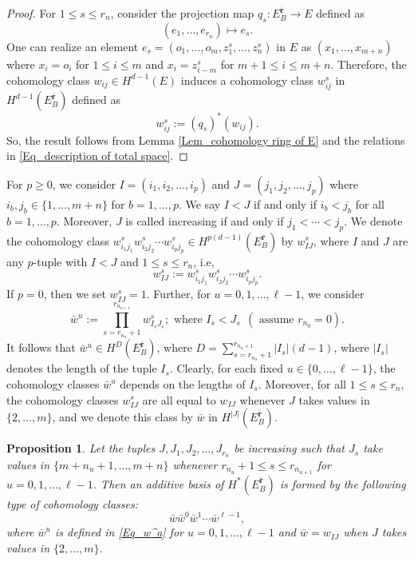 \documentclass[12pt,oneside,reqno]{amsart}
\theoremstyle{plain}
\newtheorem{proposition}[theorem]{Proposition}
\theoremstyle{definition}
\theoremstyle{remark}
\newcommand{\br}{\bar{\mathbf{r}}}
\begin{document}
\begin{proof}
For $1\leq s \leq r_n$, consider the projection map $q_s : E_B^{\br} \to E$ defined as 
$$(e_1, \ldots, e_{r_n})\mapsto e_s.$$
One can realize an element $e_s = (o_1, \ldots, o_m, z^s_1, \ldots, z^s_n)$ in $E$ as $(x_1, \ldots, x_{m+n})$ where $x_i = o_i$ for $1\leq i\leq m$ and $x_i = z^s_{i-m}$ for $m+1\leq i \leq m+n$. Therefore, the cohomology class $w_{ij}\in H^{d-1}(E)$ induces a cohomology class $w^s_{ij}$ in $H^{d-1}(E_B^{\br})$ defined as $$w^s_{ij} := (q_{s})^*(w_{ij}).$$
So, the result follows from Lemma \ref{Lem_cohomology ring of E} and the relations in \eqref{Eq_description of total space}.
\end{proof}




For $p\geq 0$, we consider $I = (i_1, i_2, \dots , i_p)$ and $J = (j_1, j_2, \dots , j_p)$ where $i_b, j_b \in \{1,\dots, m +n\}$ for $b = 1,\dots, p$. We say $I<J$ if and only if $i_b< j_b$ for all $b=1,\dots, p$. Moreover, $J$ is called increasing if and only if $j_1 < \cdots < j_p$.  
We denote the cohomology class $w^s_{i_1j_1} w^s_{i_2j_2} \cdots w^s_{i_pj_p}\in H^{p(d-1)}(E^{\br}_B)$ by $w^s_{IJ}$, where $I$ and $J$  are any $p$-tuple with $I<J$ and $1\leq s \leq r_n$, i.e, $$w^s_{IJ} := w^s_{i_1j_1} w^s_{i_2j_2} \cdots w^s_{i_pj_p}.$$
If $p=0$, then we set $w^s_{IJ} = 1$.
Further, for $u =0, 1, \ldots, \ell-1$, we consider 
\begin{equation}\label{Eq_w^a}
\bar{w}^u := \prod^{r_{n_{u+1}}}_{s = r_{n_{u}}+1} w^s_{I_sJ_s}; \text{ where } I_s < J_s ~~(\text { assume } r_{n_0} = 0).
\end{equation}
It follows that $\bar{w}^u\in H^{D}(E^{\br}_B)$, where $D = \displaystyle\sum^{r_{n_u+1}}_{s=r_{n_u}+1} |I_s|(d-1)$, where $|I_s|$ denotes the length of the tuple $I_s$. Clearly, for each fixed $u\in \{0,\ldots,\ell-1\}$, the cohomology classes $\bar{w}^u$ depends on the lengths of $I_s$. Moreover, for all $1\leq s\leq r_n$, the cohomology classes $w^s_{IJ}$ are all equal to $w_{IJ}$ whenever $J$ takes values in $\{2, \ldots, m\}$, and we denote this class by $\bar{w}$ in $H^{|J|}(E^{\br}_B)$.



\begin{proposition}\label{Prop_additive basis}
Let the tuples $J, J_1, J_2, \ldots, J_{r_n}$ be increasing such that $J_s$ take values in $\{m + n_u + 1, \ldots, m + n\}$ whenever $r_{n_u}+1\leq s\leq r_{n_{u+1}}$ for $u = 0,1,\ldots, \ell-1$. Then an additive basis of $H^*(E^{\br}_B)$ is formed by the following type of cohomology classes: $$\bar{w} \bar{w}^0 \bar{w}^1 \cdots \bar{w}^{\ell-1},$$ where $\bar{w}^u$ is defined in \eqref{Eq_w^a} for $u=0, 1, \dots, \ell-1$ and $\bar{w}=w_{IJ}$ when $J$ takes values in $\{2, \dots, m\}$.
\end{proposition}
\end{document}
